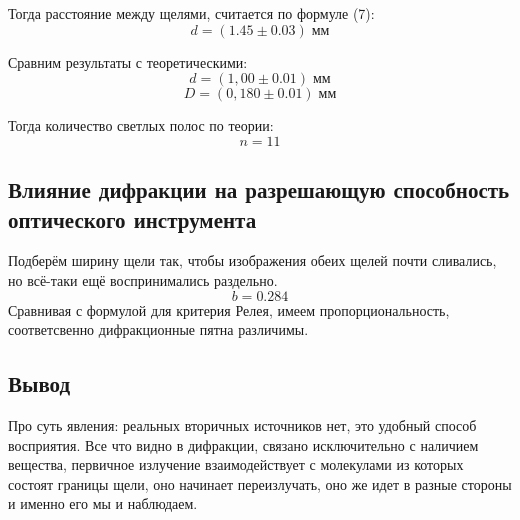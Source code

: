 \documentclass[a4paper,12pt]{article} %
\begin{document}
Тогда расстояние между щелями, считается по формуле (7):
\begin{equation*}
    d = (1.45 \pm 0.03)\; \text{мм}
\end{equation*}

Сравним результаты с теоретическими:
\begin{equation*}
    d = (1,00 \pm 0.01)\; \text{мм}
\end{equation*}
\begin{equation*}
    D = (0,180 \pm 0.01)\; \text{мм}
\end{equation*}

Тогда количество светлых полос по теории:
\begin{equation*}
    n = 11
\end{equation*}

\subsection{Влияние дифракции на разрешающую способность
оптического инструмента}
Подберём ширину щели так, чтобы изображения обеих щелей почти сливались, но всё-таки ещё воспринимались раздельно.
\begin{equation*}
    b = 0.284
\end{equation*}
Сравнивая с формулой для критерия Релея, имеем пропорциональность, соответсвенно дифракционные пятна различимы.


\subsection{Вывод} 
Про суть явления: реальных вторичных источников нет, это удобный способ восприятия. Все что видно в дифракции, связано исключительно с наличием вещества, первичное излучение взаимодействует с молекулами из которых состоят границы щели, оно начинает переизлучать, оно же идет в разные стороны и именно его мы и наблюдаем.
\end{document}

